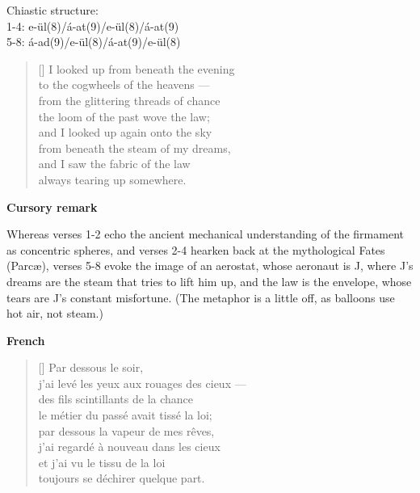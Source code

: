 \documentclass[a4paper,12pt,twoside,final]{book}
\begin{document}
\noindent Chiastic structure: \\
1-4: e-ül(8)/á-at(9)/e-ül(8)/á-at(9) \\
5-8: á-ad(9)/e-ül(8)/á-at(9)/e-ül(8)

\newpage


\settowidth{\versewidth}{from under the steam of my dreams,}

\begin{verse}[\versewidth]
  I looked up from beneath the evening \\
  to the cogwheels of the heavens --- \\
  from the glittering threads of chance \\
  the loom of the past wove the law; \\
  and I looked up again onto the sky \\
  from beneath the steam of my dreams, \\
  and I saw the fabric of the law \\
  always tearing up somewhere. \\
\end{verse}

\bigskip

\noindent \textbf{Cursory remark}

\medskip

Whereas verses 1-2 echo the ancient mechanical understanding of the
firmament as concentric spheres, and verses 2-4 hearken back at the
mythological Fates (Parc\ae), verses 5-8 evoke the image of an
aerostat, whose aeronaut is J, where J's dreams are the steam that
tries to lift him up, and the law is the envelope, whose tears are J's
constant misfortune. (The metaphor is a little off, as balloons use
hot air, not steam.)

\bigskip

\noindent \textbf{French}


\settowidth{\versewidth}{j'ai levé les yeux aux rouages des cieux ---}

\begin{verse}[\versewidth]
  Par dessous le soir, \\
  j'ai levé les yeux aux rouages des cieux --- \\
  des fils scintillants de la chance \\
  le métier du passé avait tissé la loi; \\
  par dessous la vapeur de mes rêves, \\
  j'ai regardé à nouveau dans les cieux \\
  et j'ai vu le tissu de la loi \\
  toujours se déchirer quelque part. \\
\end{verse}
\end{document}
